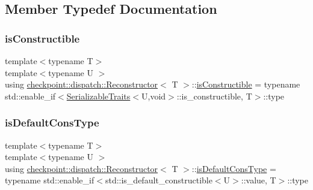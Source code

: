 \subsection{Member Typedef Documentation}
\mbox{\label{structcheckpoint_1_1dispatch_1_1_reconstructor_a6bba60a4c85d06d3e17388dfc5a55554}} 
\subsubsection{\texorpdfstring{is\+Constructible}{isConstructible}}
{\footnotesize\ttfamily template$<$typename T$>$ \\
template$<$typename U $>$ \\
using \hyperlink{structcheckpoint_1_1dispatch_1_1_reconstructor}{checkpoint\+::dispatch\+::\+Reconstructor}$<$ T $>$\+::\hyperlink{structcheckpoint_1_1dispatch_1_1_reconstructor_a6bba60a4c85d06d3e17388dfc5a55554}{is\+Constructible} =  typename std\+::enable\+\_\+if$<$\hyperlink{structcheckpoint_1_1_serializable_traits}{Serializable\+Traits}$<$U,void$>$\+::is\+\_\+constructible, T$>$\+::type}

\mbox{\label{structcheckpoint_1_1dispatch_1_1_reconstructor_ae91135a7a24b1008e7f184271fbc35d8}} 
\subsubsection{\texorpdfstring{is\+Default\+Cons\+Type}{isDefaultConsType}}
{\footnotesize\ttfamily template$<$typename T$>$ \\
template$<$typename U $>$ \\
using \hyperlink{structcheckpoint_1_1dispatch_1_1_reconstructor}{checkpoint\+::dispatch\+::\+Reconstructor}$<$ T $>$\+::\hyperlink{structcheckpoint_1_1dispatch_1_1_reconstructor_ae91135a7a24b1008e7f184271fbc35d8}{is\+Default\+Cons\+Type} =  typename std\+::enable\+\_\+if$<$std\+::is\+\_\+default\+\_\+constructible$<$U$>$\+::value, T$>$\+::type}

